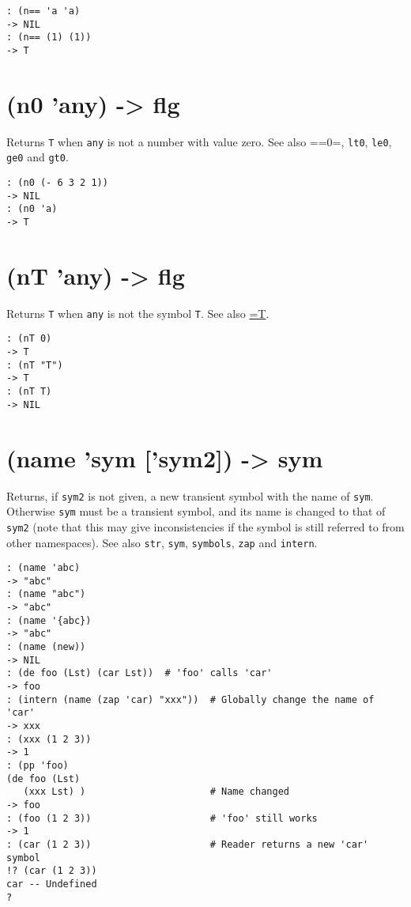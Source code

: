 {{{{{{{\begin{verbatim}
: (n== 'a 'a)
-> NIL
: (n== (1) (1))
-> T
\end{verbatim}


 
\section{(n0 'any) -> flg}
\label{sec-8-1-14-4}


Returns \texttt{T} when \texttt{any} is not a number with value zero. See also ==0=,
\texttt{lt0}, \texttt{le0}, \texttt{ge0} and \texttt{gt0}.


\begin{verbatim}
: (n0 (- 6 3 2 1))
-> NIL
: (n0 'a)
-> T
\end{verbatim}

 
\section{(nT 'any) -> flg}
\label{sec-8-1-14-5}


Returns \texttt{T} when \texttt{any} is not the symbol \texttt{T}. See also
\hyperref[ref_.html-T]{=T}.


\begin{verbatim}
: (nT 0)
-> T
: (nT "T")
-> T
: (nT T)
-> NIL
\end{verbatim}

 
\section{(name 'sym ['sym2]) -> sym}
\label{sec-8-1-14-6}


Returns, if \texttt{sym2} is not given, a new transient symbol with the name of
\texttt{sym}. Otherwise \texttt{sym} must be a transient symbol, and its name is
changed to that of \texttt{sym2} (note that this may give inconsistencies if
the symbol is still referred to from other namespaces). See also \texttt{str},
\texttt{sym}, \texttt{symbols}, \texttt{zap} and \texttt{intern}.


\begin{verbatim}
: (name 'abc)
-> "abc"
: (name "abc")
-> "abc"
: (name '{abc})
-> "abc"
: (name (new))
-> NIL
: (de foo (Lst) (car Lst))  # 'foo' calls 'car'
-> foo
: (intern (name (zap 'car) "xxx"))  # Globally change the name of 'car'
-> xxx
: (xxx (1 2 3))
-> 1
: (pp 'foo)
(de foo (Lst)
   (xxx Lst) )                      # Name changed
-> foo
: (foo (1 2 3))                     # 'foo' still works
-> 1
: (car (1 2 3))                     # Reader returns a new 'car' symbol
!? (car (1 2 3))
car -- Undefined
?
\end{verbatim}

}}}}}}}
